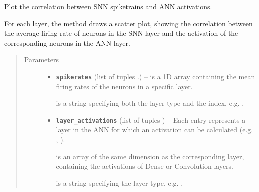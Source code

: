\documentclass[letterpaper,10pt,english]{sphinxmanual}
\begin{document}
\begin{fulllineitems}
\label{snntoolbox.io_utils:snntoolbox.io_utils.plotting.plot_confusion_matrix}
\end{fulllineitems}


\begin{fulllineitems}
\label{snntoolbox.io_utils:snntoolbox.io_utils.plotting.plot_correlations}
Plot the correlation between SNN spiketrains and ANN activations.

For each layer, the method draws a scatter plot, showing the correlation
between the average firing rate of neurons in the SNN layer and the
activation of the corresponding neurons in the ANN layer.
\begin{quote}\begin{description}
\item[{Parameters}] \leavevmode\begin{itemize}
\item {} 
\textbf{\texttt{spikerates}} (list of tuples .) -- 
 is a 1D array containing the mean firing rates of the
neurons in a specific layer.

 is a string specifying both the layer type and the index,
e.g. .


\item {} 
\textbf{\texttt{layer\_activations}} (list of tuples ) -- 
Each entry represents a layer in the ANN for which an activation can be
calculated (e.g. , ).

 is an array of the same dimension as the corresponding
layer, containing the activations of Dense or Convolution layers.

 is a string specifying the layer type, e.g. .


\end{itemize}

\end{description}\end{quote}

\end{fulllineitems}
\end{document}
